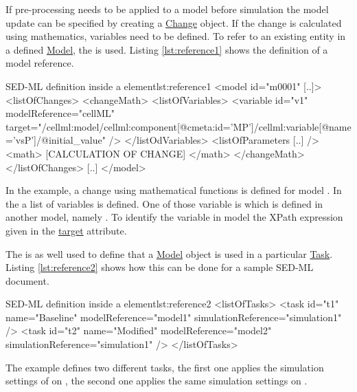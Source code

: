 If pre-processing needs to be applied to a model before simulation the model update can be specified by creating a \hyperref[class:Change]{Change} object. If the change is calculated using mathematics, variables need to be defined. To refer to an existing entity in a defined \hyperref[class:model]{Model}, the  is used. Listing \ref{lst:reference1} shows the definition of a model reference.
%
\begin{myXmlLst}{SED-ML  definition inside a  element}{lst:reference1}
<model id="m0001" [..]>
 <listOfChanges>
   <changeMath>
    <listOfVariables>
     <variable id="v1" modelReference="cellML" target="/cellml:model/cellml:component[@cmeta:id='MP']/cellml:variable[@name='vsP']/@initial_value" />
    </listOdVariables>
    <listOfParameters [..] />
    <math>
     [CALCULATION OF CHANGE]
    </math>
   </changeMath>
 </listOfChanges>
 [..]
</model>
\end{myXmlLst}
%
In the example, a change using mathematical functions is defined for model . In the  a list of variables is defined. One of those variable is  which is defined in another model, namely . To identify the variable in model  the XPath expression given in the \hyperref[sec:target]{target} attribute.

The  is as well used to define that a \hyperref[class:model]{Model} object is used in a particular  \hyperref[class:task]{Task}. 
Listing \ref{lst:reference2} shows how this can be done for a sample SED-ML document.
%
\begin{myXmlLst}{SED-ML  definition inside a  element}{lst:reference2}
<listOfTasks>
 <task id="t1" name="Baseline" modelReference="model1" simulationReference="simulation1" />
 <task id="t2" name="Modified" modelReference="model2" simulationReference="simulation1" />
</listOfTasks>
\end{myXmlLst}
%
The example defines two different tasks, the first one applies the simulation settings of  on , the second one applies the same simulation settings on .

